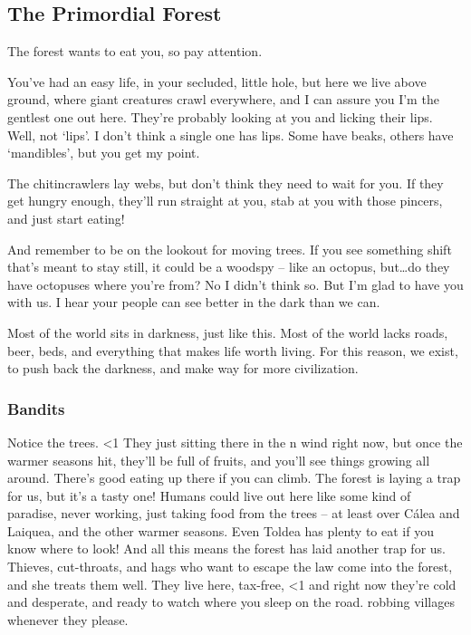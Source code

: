 \begin{multicols}{2}

\subsection*{The Primordial Forest}

\begin{exampletext}

  The forest wants to eat you, so pay attention.

  You've had an easy life, in your secluded, little hole, but here we live above ground, where giant creatures crawl everywhere, and I can assure you I'm the gentlest one out here.
  They're probably looking at you and licking their lips.
Well, not `lips'.
  I don't think a single one has lips.
  Some have beaks, others have `mandibles', but you get my point.

  The chitincrawlers lay webs, but don't think they need to wait for you.
  If they get hungry enough, they'll run straight at you, stab at you with those pincers, and just start eating!

  And remember to be on the lookout for moving trees.
  If you see something shift that's meant to stay still, it could be a woodspy -- like an octopus, but\ldots do they have octopuses where you're from?
  No I didn't think so.
  But I'm glad to have you with us.
  I hear your people can see better in the dark than we can.

  Most of the world sits in darkness, just like this.
  Most of the world lacks roads, beer, beds, and everything that makes life worth living.
  For this reason, we exist, to push back the darkness, and make way for more civilization.

  \subsubsection*{Bandits}

  Notice the trees.
  \ifnum\value{temperature}<1
    They just sitting there in the \showSeason n wind right now, but once the warmer seasons hit, they'll be full of fruits, and you'll see things growing all around.
  \else
    There's good eating up there if you can climb.
    The forest is laying a trap for us, but it's a tasty one!
  \fi
  Humans could live out here like some kind of paradise, never working, just taking food from the trees -- at least over C\'alea and Laiquea, and the other warmer seasons.
  Even Toldea has plenty to eat if you know where to look!
  And all this means the forest has laid another trap for us.
  Thieves, cut-throats, and hags who want to escape the law come into the forest, and she treats them well.
  They live here, tax-free,
  \ifnum\value{temperature}<1
    and right now they're cold and desperate, and ready to watch where you sleep on the road.
  \else
    robbing \glspl{village} whenever they please.
  \fi


\end{exampletext}
\end{multicols}
